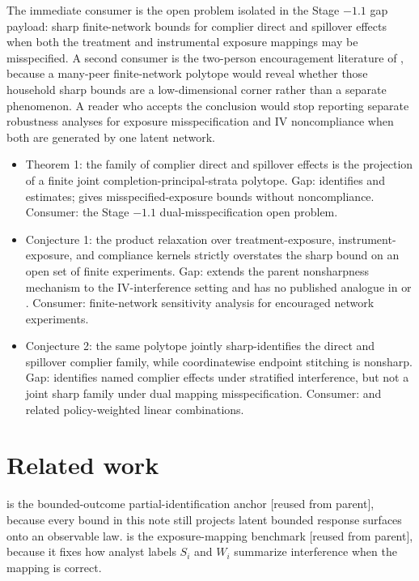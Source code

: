 \documentclass[11pt]{article}
\theoremstyle{definition}
\theoremstyle{plain}
\theoremstyle{remark}
\begin{document}
The immediate consumer is the open problem isolated in the Stage \(-1.1\) gap payload: sharp finite-network bounds for complier direct and spillover effects when both the treatment and instrumental exposure mappings may be misspecified. A second consumer is the two-person encouragement literature of \citet{acerenza_martinez_iriarte_sanchez_becerra_spini_2025_household_bounds}, because a many-peer finite-network polytope would reveal whether those household sharp bounds are a low-dimensional corner rather than a separate phenomenon. A reader who accepts the conclusion would stop reporting separate robustness analyses for exposure misspecification and IV noncompliance when both are generated by one latent network.

\begin{itemize}[leftmargin=*]
\item Theorem 1: the family of complier direct and spillover effects is the projection of a finite joint completion-principal-strata polytope. Gap: \citet{hoshino_yanagi_2024_noncompliance_unknown_interference} identifies and estimates; \citet{schroder_oprescu_feuerriegel_kallus_2026_networks_partialid} gives misspecified-exposure bounds without noncompliance. Consumer: the Stage \(-1.1\) dual-misspecification open problem.
\item Conjecture 1: the product relaxation over treatment-exposure, instrument-exposure, and compliance kernels strictly overstates the sharp bound on an open set of finite experiments. Gap: extends the parent nonsharpness mechanism to the IV-interference setting and has no published analogue in \citet{savje_2024_misspecified_exposure_mappings} or \citet{vazquez_bare_2023_iv_spillovers}. Consumer: finite-network sensitivity analysis for encouraged network experiments.
\item Conjecture 2: the same polytope jointly sharp-identifies the direct and spillover complier family, while coordinatewise endpoint stitching is nonsharp. Gap: \citet{imai_jiang_malani_2021_interference_noncompliance} identifies named complier effects under stratified interference, but not a joint sharp family under dual mapping misspecification. Consumer: \citet{nibbering_oosterveen_2025_iv_interference_policy} and related policy-weighted linear combinations.
\end{itemize}

\section{Related work}
\citet{Manski1990} is the bounded-outcome partial-identification anchor [reused from parent], because every bound in this note still projects latent bounded response surfaces onto an observable law. \citet{AronowSamii2017} is the exposure-mapping benchmark [reused from parent], because it fixes how analyst labels \(S_i\) and \(W_i\) summarize interference when the mapping is correct.
\end{document}
